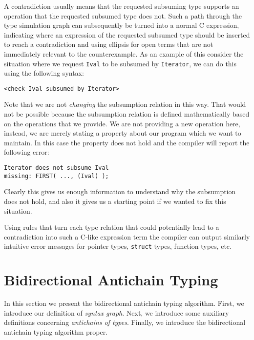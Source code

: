 \documentclass{sigplanconf}
\newcommand{\concept}[1]{\emph{#1}}
\begin{document}
A contradiction usually means that the requested subsuming type
supports an operation that the requested subsumed type does not. Such
a path through the type simulation graph can subsequently be turned
into a normal C expression, indicating where an expression of the
requested subsumed type should be inserted to reach a contradiction
and using ellipsis for open terms that are not immediately relevant to
the counterexample. As an example of this consider the situation where
we request \verb+Ival+ to be subsumed by \verb+Iterator+, we can do
this using the following syntax:
\begin{samepage}
\begin{verbatim}
<check Ival subsumed by Iterator>
\end{verbatim}
\end{samepage}
Note that we are not \emph{changing} the subsumption relation in this
way. That would not be possible because the subsumption relation is
defined mathematically based on the operations that we provide. We are
not providing a new operation here, instead, we are merely stating a
property about our program which we want to maintain.  In this case
the property does not hold and the compiler will report the following
error:
\begin{samepage}
\begin{verbatim}
Iterator does not subsume Ival
missing: FIRST( ..., (Ival) );
\end{verbatim}
\end{samepage}
Clearly this gives us enough information to understand why the
subsumption does not hold, and also it gives us a starting point if we
wanted to fix this situation.

Using rules that turn each type relation that could potentially lead
to a contradiction into such a C-like expression term the compiler can
output similarly intuitive error messages for pointer types,
\verb+struct+ types, function types, etc.

\section{Bidirectional Antichain Typing}\label{sec:typing}

In this section we present the bidirectional antichain typing
algorithm.
First, we introduce our definition of \concept{syntax graph}.
Next, we introduce some auxiliary definitions concerning
\concept{antichains of types}. 
Finally, we introduce the bidirectional antichain typing algorithm
proper.
\end{document}

